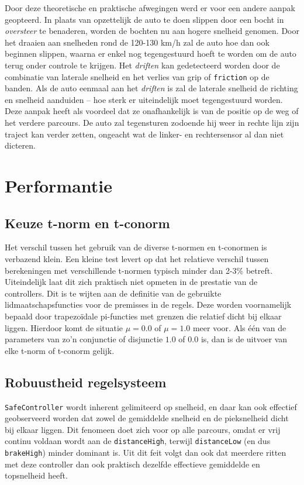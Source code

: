 \documentclass[10pt,a4paper]{article}
\begin{document}
			Door deze theoretische en praktische afwegingen werd er voor een andere aanpak geopteerd. In plaats van opzettelijk de auto te doen slippen door een bocht in \textit{oversteer} te benaderen, worden de bochten nu aan hogere snelheid genomen. Door het draaien aan snelheden rond de 120-130 km/h zal de auto hoe dan ook beginnen slippen, waarna er enkel nog tegengestuurd hoeft te worden om de auto terug onder controle te krijgen. Het \textit{driften} kan gedetecteerd worden door de combinatie van laterale snelheid en het verlies van grip of \texttt{friction} op de banden. Als de auto eenmaal aan het \textit{driften} is zal de laterale snelheid de richting en snelheid aanduiden -- hoe sterk er uiteindelijk moet tegengestuurd worden. Deze aanpak heeft als voordeel dat ze onafhankelijk is van de positie op de weg of het verdere parcours. De auto zal tegensturen zodoende hij weer in rechte lijn zijn traject kan verder zetten, ongeacht wat de linker- en rechtersensor al dan niet dicteren.\\

	\section{Performantie}
		\subsection{Keuze t-norm en t-conorm}
			Het verschil tussen het gebruik van de diverse t-normen en t-conormen is verbazend klein. Een kleine test levert op dat het relatieve verschil tussen berekeningen met verschillende t-normen typisch minder dan 2-3\% betreft. Uiteindelijk laat dit zich praktisch niet opmeten in de prestatie van de controllers. Dit is te wijten aan de definitie van de gebruikte lidmaatschapsfuncties voor de premisses in de regels. Deze worden voornamelijk bepaald door trapezo\"idale pi-functies met grenzen die relatief dicht bij elkaar liggen. Hierdoor komt de situatie $\mu = 0.0$ of $\mu = 1.0$ meer voor. Als \'e\'en van de parameters van zo'n conjunctie of disjunctie $1.0$ of $0.0$ is, dan is de uitvoer van elke t-norm of t-conorm gelijk.\\

		\subsection{Robuustheid regelsysteem}
			\texttt{SafeController} wordt inherent gelimiteerd op snelheid, en daar kan ook effectief geobserveerd worden dat zowel de gemiddelde snelheid en de pieksnelheid dicht bij elkaar liggen. Dit fenomeen doet zich voor op alle parcours, omdat er vrij continu voldaan wordt aan de \texttt{distanceHigh}, terwijl \texttt{distanceLow} (en dus \texttt{brakeHigh}) minder dominant is. Uit dit feit volgt dan ook dat meerdere ritten met deze controller dan ook praktisch dezelfde effectieve gemiddelde en topsnelheid heeft.\\
\end{document}
